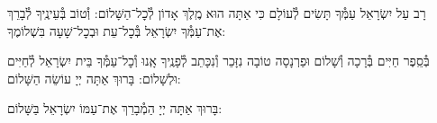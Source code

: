 \documentclass[twoside, openany, parskip=half, 11pt]{book}
\begin{document}
\maarivmodim

\alhanisim

\weekdaysahodos

רָב עַל יִשְׂרָאֵל עַמְּ֯ךָ תָּשִׂים לְ֯עוֹלָם כִּי אַתָּה הוּא מֶֽלֶךְ אָדוֹן לְ֯כׇל־הַשָּׁלוֹם: וְ֯טוֹב בְּ֯עֵינֶֽיךָ לְ֯בָרֵךְ אֶת־עַמְּ֯ךָ יִשְׂרָאֵל בְּ֯כׇל־עֵת וּבְכׇל־שָׁעָה בִּשְׁלוֹמֶךָ:
\vspace{-0.4\baselineskip}
\begin{paracol}{2}

\begin{small}
בְּ֯סֵֽפֶר חַיִּים בְּ֯רָכָה וְ֯שָׁלוֹם וּפַרְנָסָה טוֹבָה נִזָּכֵר וְ֯נִכָּתֵב לְ֯פָנֶֽיךָ אָֽנוּ וְ֯כׇל־עַמְּ֯ךָ בֵּית יִשְׂרָאֵל לְ֯חַיִּים וּלְשָׁלוֹם: בָּרוּךְ אַתָּה יְיָ עוֹשֵׂה הַשָּׁלוֹם:

\end{small}
\switchcolumn
בָּרוּךְ אַתָּה יְיָ הַמְ֯בָרֵךְ אֶת־עַמּוֹ יִשְׂרָאֵל בַּשָּׁלוֹם:

\end{paracol}



\tachanunim

\vspace{\baselineskip}
\end{document}
